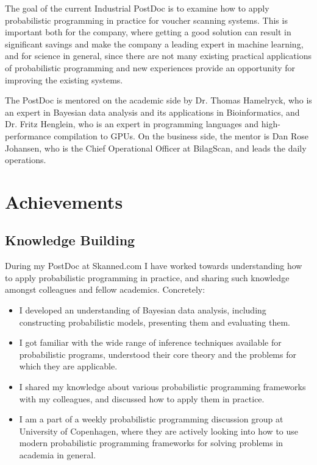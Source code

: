 \documentclass[12pt,a4paper]{article}
\begin{document}
The goal of the current Industrial PostDoc is to examine how to apply
probabilistic programming in practice for voucher scanning systems. This is
important both for the company, where getting a good solution can result in
significant savings and make the company a leading expert in machine learning,
and for science in general, since there are not many existing practical
applications of probabilistic programming and new experiences provide an
opportunity for improving the existing systems.

The PostDoc is mentored on the academic side by Dr. Thomas Hamelryck, who is an
expert in Bayesian data analysis and its applications in Bioinformatics, and
Dr. Fritz Henglein, who is an expert in programming languages and high-performance
compilation to GPUs. On the business side, the mentor is Dan Rose Johansen, who
is the Chief Operational Officer at BilagScan, and leads the daily operations.

\section{Achievements}
\subsection{Knowledge Building} During my PostDoc at Skanned.com I have worked
towards understanding how to apply probabilistic programming in practice, and
sharing such knowledge amongst colleagues and fellow academics.
Concretely:
\begin{itemize}
\item I developed an understanding of Bayesian data analysis, including
  constructing probabilistic models, presenting them and evaluating them.
\item I got familiar with the wide range of inference techniques
  available for probabilistic programs, understood
  their core theory and the problems for which they are applicable.
\item I shared my knowledge about various probabilistic programming frameworks with
  my colleagues, and discussed how to apply them in practice.
\item I am a part of a weekly probabilistic programming discussion group at University of Copenhagen, where they are actively looking into
  how to use modern probabilistic programming frameworks for solving problems in academia in general.
\end{itemize}
\end{document}
